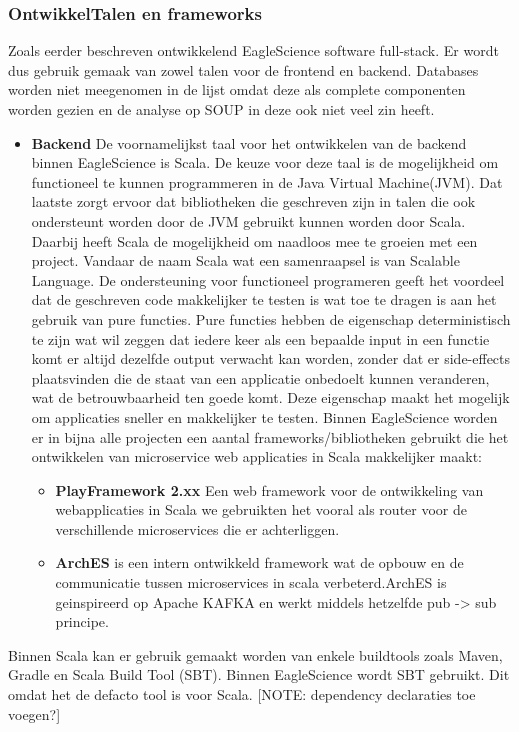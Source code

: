 \subsubsection{OntwikkelTalen en frameworks}\label{subsubsec:ontwikkeltalen-en-frameworks}
Zoals eerder beschreven ontwikkelend EagleScience software full-stack. Er wordt dus gebruik gemaak van zowel talen voor de frontend en backend. Databases worden niet meegenomen in de lijst omdat deze als complete componenten worden gezien en de analyse op SOUP in deze ook niet veel zin heeft.
\begin{itemize}
    \item \textbf{Backend} De voornamelijkst taal voor het ontwikkelen van de backend binnen EagleScience is Scala. De keuze voor deze taal is de mogelijkheid om functioneel te kunnen programmeren in de Java Virtual Machine(JVM). Dat laatste zorgt ervoor dat bibliotheken die geschreven zijn in talen die ook ondersteunt worden door de JVM gebruikt kunnen worden door Scala. Daarbij heeft Scala de mogelijkheid om naadloos mee te groeien met een project. Vandaar de naam Scala wat een samenraapsel is van Scalable Language. De ondersteuning voor functioneel programeren geeft het voordeel dat de geschreven code makkelijker te testen is wat toe te dragen is aan het gebruik van pure functies. Pure functies hebben de eigenschap deterministisch te zijn wat wil zeggen dat iedere keer als een bepaalde input in een functie komt er altijd dezelfde output verwacht kan worden, zonder dat er side-effects plaatsvinden die de staat van een applicatie onbedoelt kunnen veranderen, wat de betrouwbaarheid ten goede komt. Deze eigenschap maakt het mogelijk om applicaties sneller en makkelijker te testen. Binnen EagleScience worden er in bijna alle projecten een aantal frameworks/bibliotheken gebruikt die het ontwikkelen van microservice web applicaties in Scala makkelijker maakt:
    \begin{itemize}
        \item \textbf{PlayFramework 2.xx} Een web framework voor de ontwikkeling van webapplicaties in Scala we gebruikten het vooral als router voor de verschillende microservices die er achterliggen.
        \item \textbf{ArchES} is een intern ontwikkeld framework wat de opbouw en de communicatie tussen microservices in scala verbeterd.ArchES is geinspireerd op Apache KAFKA en werkt middels hetzelfde pub -> sub principe.
    \end{itemize}
\end{itemize}
Binnen Scala kan er gebruik gemaakt worden van enkele buildtools zoals Maven, Gradle en Scala Build Tool (SBT). Binnen EagleScience wordt SBT gebruikt. Dit omdat het de defacto tool is voor Scala.
[NOTE: dependency declaraties toe voegen?]

